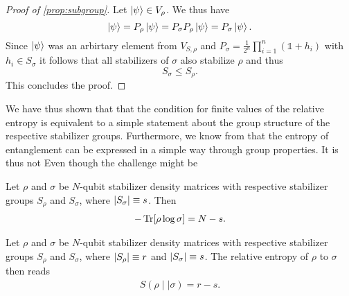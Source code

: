 \begin{proof}[Proof of \cref{prop:subgroup}]
  Let $\ket{\psi} \in V_\rho$. We thus have
  \[
    \ket{\psi} = P_\rho \ket{\psi} = P_\sigma P_\rho \ket{\psi} = P_\sigma
    \ket{\psi}.
  \]
  Since $\ket{\psi}$ was an arbirtary element from $V_{S,\rho}$ and $P_\sigma =
  \frac{1}{2^n} \prod_{i=1}^n \left(\mathds{1} + h_i\right)$ with $h_i \in
  S_\sigma$ it follows that all stabilizers of $\sigma$ also stabilize $\rho$
  and thus
  \[
    S_\sigma \leq S_\rho.
  \]
  This concludes the proof.
\end{proof}
We have thus shown that that the condition for finite values of the relative
entropy is equivalent to a simple statement about the group structure of the
respective stabilizer groups. Furthermore, we know from
\cite{fattalEntanglementStabilizerFormalism2004} that the entropy of
entanglement can be expressed in a simple way through group properties.
It is thus not 
Even though the challenge might be 
\begin{thm}\label{thm:cross-ent-stab}
  Let $\rho$ and $\sigma$ be $N$-qubit stabilizer density matrices with
  respective stabilizer groups $S_\rho$ and $S_\sigma$, where $\abs{S_\sigma}
  \equiv s$. Then
  \begin{align}
    -\Tr[\rho\log\sigma] = N - s
  .\end{align}
\end{thm}

\begin{cor}\label{col:rel-ent-stab}
  Let $\rho$ and $\sigma$ be $N$-qubit stabilizer density matrices with
  respective stabilizer groups $S_\rho$ and $S_\sigma$, where $\abs{S_\rho}
  \equiv r$ and $\abs{S_\sigma} \equiv s$. The relative entropy of $\rho$ to
  $\sigma$ then reads
  \begin{align}
    S\left(\rho\mid\mid\sigma\right) = r - s
  .\end{align}
\end{cor}

